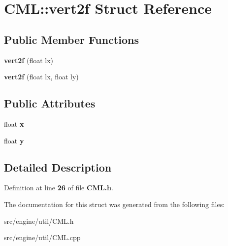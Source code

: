 \section{C\+ML\+:\+:vert2f Struct Reference}
\label{struct_c_m_l_1_1vert2f}
\subsection*{Public Member Functions}
\begin{DoxyCompactItemize}
\item 
\mbox{\label{struct_c_m_l_1_1vert2f_a0dca5879565e349779a91909d4c7b0b3}} 
{\bfseries vert2f} (float lx)
\item 
\mbox{\label{struct_c_m_l_1_1vert2f_a8d5b35b2ebe58d7456711e0bc359782c}} 
{\bfseries vert2f} (float lx, float ly)
\end{DoxyCompactItemize}
\subsection*{Public Attributes}
\begin{DoxyCompactItemize}
\item 
\mbox{\label{struct_c_m_l_1_1vert2f_a8747eb0f2f2c41bf71928ba651eafdac}} 
float {\bfseries x}
\item 
\mbox{\label{struct_c_m_l_1_1vert2f_af49d04f72498bc2f797d756df18011bc}} 
float {\bfseries y}
\end{DoxyCompactItemize}


\subsection{Detailed Description}


Definition at line \textbf{ 26} of file \textbf{ C\+M\+L.\+h}.



The documentation for this struct was generated from the following files\+:\begin{DoxyCompactItemize}
\item 
src/engine/util/C\+M\+L.\+h\item 
src/engine/util/C\+M\+L.\+cpp\end{DoxyCompactItemize}
